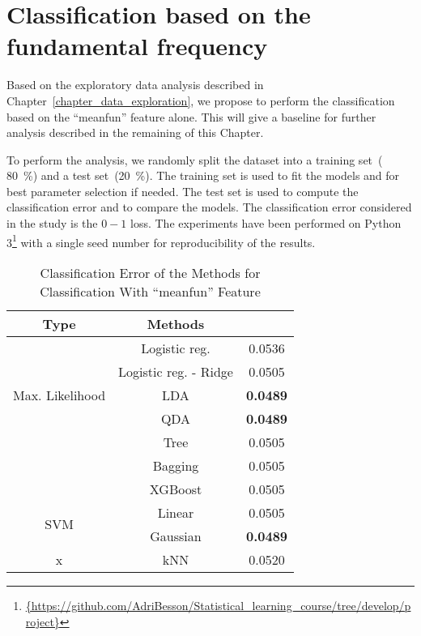 \section{Classification based on the fundamental frequency}
\label{sec_intuitive_approach}
Based on the exploratory data analysis described in Chapter~\ref{chapter_data_exploration}, we propose to perform the classification based on the ``meanfun'' feature alone. 
This will give a baseline for further analysis described in the remaining of this Chapter.

To perform the analysis, we randomly split the dataset into a training set~( \SI{80}{\percent}) and a test set~(\SI{20}{\percent}). The training set is used to fit the models and for best parameter selection if needed. The test set is used to compute the classification error and to compare the models. The classification error considered in the study is the $0-1$ loss. 
The experiments have been performed on Python \num{3}\footnote{\url{{https://github.com/AdriBesson/Statistical_learning_course/tree/develop/project}}} with a single seed number for reproducibility of the results.
\begin{table}[htb]
	\caption{Classification Error of the Methods for Classification With ``meanfun'' Feature}
	\begin{center}
		\begin{tabular}{@{} c c c @{}}\toprule
			Type & Methods & \\
			\midrule
			\multirow{5}{*}{Max. Likelihood} & Logistic reg. & \num{0.0536} \\
			& Logistic reg. - Ridge & \num{0.0505}  \\
			& LDA & \textbf{\num{0.0489}} \\
			& QDA & \textbf{\num{0.0489}} \\
			\cmidrule{1-3}
			\multirow{3}{*}{Trees} & Tree & \num{0.0505} \\
			& Bagging & \num{0.0505} \\
			& XGBoost & \num{0.0505}\\
			\cmidrule{1-3}
			\multirow{2}{*}{SVM} & Linear & \num{0.0505} \\
			& Gaussian & \textbf{\num{0.0489}} \\
			\cmidrule{1-3}
			x & kNN & \num{0.0520}\\
			\bottomrule
		\end{tabular}
	\end{center}
	\label{tab_res_meanfun}
\end{table}

